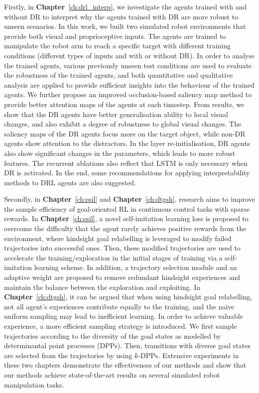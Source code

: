 Firstly, in \textbf{Chapter}~\ref{ch:drl_interp}, we investigate the agents trained with and without DR to interpret why the agents trained with DR are more robust to unseen scenarios. In this work, we built two simulated robot environments that provide both visual and proprioceptive inputs. The agents are trained to manipulate the robot arm to reach a specific target with different training conditions (different types of inputs and with or without DR). In order to analyse the trained agents, various previously unseen test conditions are used to evaluate the robustness of the trained agents, and both quantitative and qualitative analysis are applied to provide sufficient insights into the behaviour of the trained agents. We further propose an improved occlusion-based saliency map method to provide better attention maps of the agents at each timestep. From results, we show that the DR agents have better generalisation ability to local visual changes, and also exhibit a degree of robustness to global visual changes. The saliency maps of the DR agents focus more on the target object, while non-DR agents show attention to the distractors. In the layer re-initialisation, DR agents also show significant changes in the parameters, which leads to more robust features. The recurrent ablations also reflect that LSTM is only necessary when DR is activated. In the end, some recommendations for applying interpretability methods to DRL agents are also suggested. 

Secondly, in \textbf{Chapter}~\ref{ch:esil} and \textbf{Chapter}~\ref{ch:dtgsh}, research aims to improve the sample efficiency of goal-oriented RL in continuous control tasks with sparse rewards. In \textbf{Chapter}~\ref{ch:esil}, a novel self-imitation learning loss is proposed to overcome the difficulty that the agent rarely achieves positive rewards from the environment, where hindsight goal relabelling is leveraged to modify failed trajectories into successful ones. Then, these modified trajectories are used to accelerate the training/exploration in the initial stages of training via a self-imitation learning scheme. In addition, a trajectory selection module and an adaptive weight are proposed to remove redundant hindsight experiences and maintain the balance between the exploration and exploiting. In \textbf{Chapter}~\ref{ch:dtgsh}, it can be argued that when using hindsight goal relabelling, not all agent's experiences contribute equally to the training, and the naive uniform sampling may lead to inefficient learning. In order to achieve valuable experience, a more efficient sampling strategy is introduced. We first sample trajectories according to the diversity of the goal states as modelled by determinantal point processes (DPPs). Then, transitions with diverse goal states are selected from the trajectories by using $k$-DPPs. Extensive experiments in these two chapters demonstrate the effectiveness of our methods and show that our methods achieve state-of-the-art results on several simulated robot manipulation tasks.

